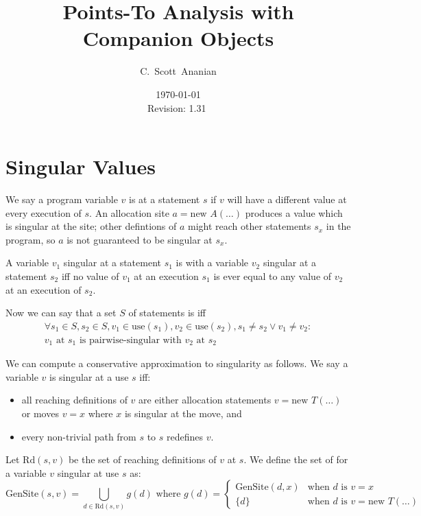 \documentclass[11pt,notitlepage]{article}
\author{C.~Scott~Ananian}
\title{Points-To Analysis with Companion Objects}
\date{\today \\ $ $Revision: 1.31 $ $}
\begin{document}

\maketitle
\section{Singular Values}

We say a program variable $v$ is  at a statement $s$
if $v$ will have a different value at every execution of $s$.  An
allocation site $a = \text{new }A(\ldots)$ produces a value which is singular
at the site; other defintions of $a$ might reach other statements
$s_x$ in the program, so $a$ is not guaranteed to be singular at $s_x$.

A variable $v_1$ singular at a statement $s_1$ is
 with a variable $v_2$ singular at a statement
$s_2$ iff no value of $v_1$ at an execution $s_1$ is ever equal to any
value of $v_2$ at an execution of $s_2$.

Now we can say that a set $S$ of statements is
 iff
\begin{multline*}
\forall s_1 \in S, s_2 \in S, v_1 \in \text{use}(s_1), v_2 \in \text{use}(s_2),
  s_1 \neq s_2 \vee v_1 \neq v_2:
\\
v_1 \text{ at } s_1 \text{ is pairwise-singular with } v_2 \text{ at } s_2
\end{multline*}

We can compute a conservative approximation to singularity as follows.
We say a variable $v$ is singular at a use $s$ iff:
\begin{itemize}
\item all reaching definitions of $v$ are either allocation statements 
$v = \text{new }T(\ldots)$ or moves $v = x$ where $x$ is singular at
the move, and
\item every non-trivial path from $s$ to $s$ redefines $v$.
\end{itemize}

Let $\text{Rd}(s,v)$ be the set of reaching definitions of $v$ at $s$.
We define the set of  for a variable $v$ singular at
use $s$ as:
\begin{displaymath}
\text{GenSite}(s,v) %
 =
\bigcup_{d \in \text{Rd}(s,v)} g(d)
\text{ where }
g(d) = \begin{cases}
                \text{GenSite}(d,x) &\text{when } d \text{ is } v=x \\
                \{d\}&\text{when } d \text{ is } v=\text{new } T(\ldots)
       \end{cases}
\end{displaymath}
\end{document}
